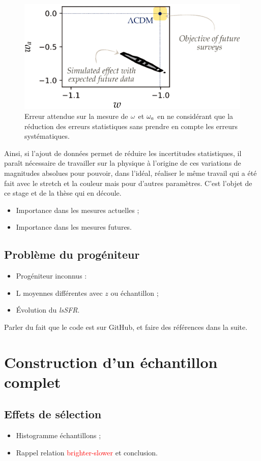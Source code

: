 \documentclass[a4paper, 12pt, svgnames]{article}
\begin{document}
\begin{figure}[htbp!]
    \centering
    \includegraphics[width=.5\linewidth]{Rapport_figures/error.PNG}
    \captionsetup{justification=centering}
    \caption{Erreur attendue sur la mesure de $\omega$ et $\omega_a$ en ne considérant
    que la réduction des erreurs statistiques sans prendre en compte les erreurs
    systématiques.}
    \label{err_syst}
\end{figure}

Ainsi, si l'ajout de données permet de réduire
les incertitudes statistiques, il paraît nécessaire de travailler sur la
physique à l'origine de ces variations de magnitudes absolues pour pouvoir, dans
l'idéal, réaliser le même travail qui a été fait avec le stretch et la couleur
mais pour d'autres paramètres. C'est l'objet de ce stage et de la thèse qui en
découle.

\begin{itemize}
    \item Importance dans les mesures actuelles ;
    \item Importance dans les mesures futures.
\end{itemize}

\subsection{Problème du progéniteur}
\begin{itemize}
    \item Progéniteur inconnus :
    \item L moyennes différentes avec $z$ ou échantillon ;
    \item Évolution du \textit{lsSFR}.
\end{itemize}

Parler du fait que le code est sur GitHub, et faire des références dans la
suite.

\section{Construction d'un échantillon complet}
\subsection{Effets de sélection}
\begin{itemize}
    \item Histogramme échantillons ;
    \item Rappel relation \textcolor{red}{brighter-slower} et conclusion.
\end{itemize}
\end{document}
